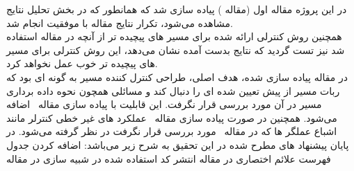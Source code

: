در این پروژه مقاله اول (مقاله \آ) پیاده سازی شد که همانطور که در بخش تحلیل نتایج مشاهده می‌‌‌‌‌‌شود، تکرار نتایج مقاله با موفقیت انجام شد.\\
همچنین روش کنترلی ارائه شده برای مسیر های پیچیده تر از آنچه در مقاله استفاده شد نیز تست گردید که نتایج بدست آمده نشان می‌دهد، این روش کنترلی برای مسیر های پیچیده تر خوب عمل نخواهد کرد.\\
در مقاله پیاده سازی شده، هدف اصلی، طراحی کنترل کننده مسیر به گونه ای بود که ربات مسیر از پیش تعیین شده ای را دنبال کند و مسائلی همچون نحوه داده برداری مسیر در آن مورد بررسی قرار نگرفت. این قابلیت با پیاده سازی مقاله \ب\ اضافه می‌شود. همچنین در صورت پیاده سازی مقاله \پ\ عملکرد های غیر خطی کنترلر مانند اشباع عملگر ها که در مقاله \آ\ مورد بررسی قرار نگرفت در نظر گرفته می‌شود.  
در پایان  پیشنهاد های مطرح شده در این تحقیق به شرح زیر می‌باشد:
 اضافه کردن جدول فهرست علائم اختصاری در مقاله \آ
 انتشر کد استفاده شده در شبیه سازی در مقاله \آ
